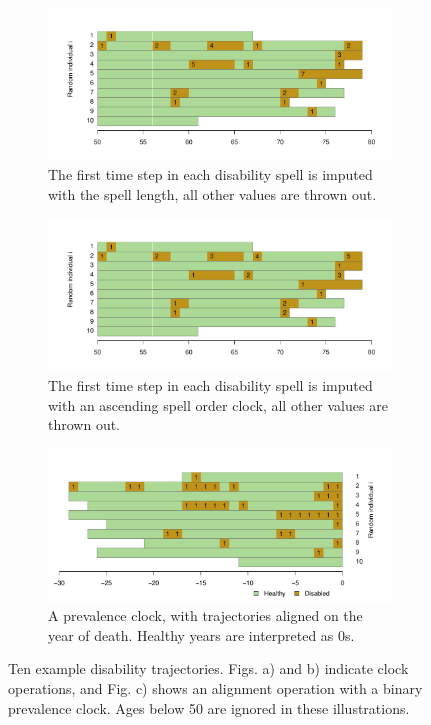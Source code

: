 \documentclass{article}
\begin{document}
\begin{figure}
    \centering
    \begin{subfigure}{\textwidth}
      \centering
    \includegraphics[scale=.45]{Figures/App1_grammar1.pdf}
    \caption{The first time step in each disability spell is imputed with the spell length, all other values are thrown out.}
    \label{fig:a1g1}
    \end{subfigure}
    
        \begin{subfigure}{\textwidth}
          \centering
    \includegraphics[scale=.45]{Figures/App1_grammar2.pdf}
    \caption{The first time step in each disability spell is imputed with an ascending spell order clock, all other values are thrown out.}
    \label{fig:a1g2}
    \end{subfigure}
    
        \begin{subfigure}{\textwidth}
          \centering
          \includegraphics[scale=.45]{Figures/App1_grammar3.pdf}
    \caption{A prevalence clock, with trajectories aligned on the year of death. Healthy years are interpreted as 0s.}
    \label{fig:a1g3}
    \end{subfigure}
    \caption{Ten example disability trajectories. Figs. a) and b) indicate clock operations, and Fig. c) shows an alignment operation with a binary prevalence clock. Ages below 50 are ignored in these illustrations.}
    \label{fig:a1traj}
\end{figure}
\end{document}
